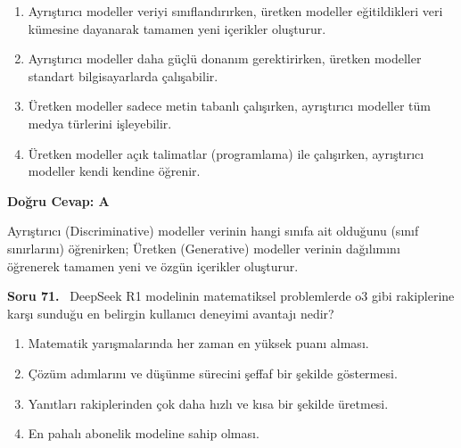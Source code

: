 \documentclass[11pt,a4paper,openany]{book}
\begin{document}
\begin{enumerate}[label=\Alph*), leftmargin=25pt, topsep=4pt, itemsep=2pt]
        \item Ayrıştırıcı modeller veriyi sınıflandırırken, üretken modeller eğitildikleri veri kümesine dayanarak tamamen yeni içerikler oluşturur.
        \item Ayrıştırıcı modeller daha güçlü donanım gerektirirken, üretken modeller standart bilgisayarlarda çalışabilir.
        \item Üretken modeller sadece metin tabanlı çalışırken, ayrıştırıcı modeller tüm medya türlerini işleyebilir.
        \item Üretken modeller açık talimatlar (programlama) ile çalışırken, ayrıştırıcı modeller kendi kendine öğrenir.
\end{enumerate}

\vspace{4pt}
\begin{tcolorbox}[title=Cevap ve Açıklama, colback=gray!3!white, colframe=primarycolor!90!black, arc=2mm, fonttitle=\bfseries\sffamily, top=6pt, bottom=6pt]
    \textbf{Doğru Cevap: A}

    \vspace{2pt}
    Ayrıştırıcı (Discriminative) modeller verinin hangi sınıfa ait olduğunu (sınıf sınırlarını) öğrenirken; Üretken (Generative) modeller verinin dağılımını öğrenerek tamamen yeni ve özgün içerikler oluşturur.
\end{tcolorbox}
\vspace{10pt}
\needspace{5cm}
\vspace{8pt}
\noindent\textbf{\large\sffamily Soru 71.} \ DeepSeek R1 modelinin matematiksel problemlerde o3 gibi rakiplerine karşı sunduğu en belirgin kullanıcı deneyimi avantajı nedir?

\begin{enumerate}[label=\Alph*), leftmargin=25pt, topsep=4pt, itemsep=2pt]
        \item Matematik yarışmalarında her zaman en yüksek puanı alması.
        \item Çözüm adımlarını ve düşünme sürecini şeffaf bir şekilde göstermesi.
        \item Yanıtları rakiplerinden çok daha hızlı ve kısa bir şekilde üretmesi.
        \item En pahalı abonelik modeline sahip olması.
\end{enumerate}
\end{document}
